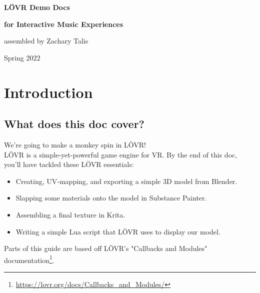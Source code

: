 \documentclass[12pt, letterpaper]{article}
\begin{document}
\begin{titlepage}
    \begin{center}

        \vspace*{5cm}

        \Large{\textbf{L{\"O}VR Demo Docs}}

        \vspace{-0.25cm}

        \Large{\textbf{for Interactive Music Experiences}}

        \vspace{0.5cm}

        \large{assembled by Zachary Talis}

        \vfill

        \small{Spring 2022}

    \end{center}
\end{titlepage}

\tableofcontents
\newpage

\section{Introduction}

\subsection{What does this doc cover?}
We're going to make a monkey spin in L{\"O}VR!\\
L{\"O}VR is a simple-yet-powerful game engine for VR. By the end of this doc, you'll have tackled these L{\"O}VR essentials:
\begin{itemize}
    \item Creating, UV-mapping, and exporting a simple 3D model from Blender.
    \item Slapping some materials onto the model in Substance Painter.
    \item Assembling a final texture in Krita.
    \item Writing a simple Lua script that L{\"O}VR uses to display our model.
\end{itemize}
Parts of this guide are based off L{\"O}VR's "Callbacks and Modules" documentation\footnote{\url{https://lovr.org/docs/Callbacks_and_Modules/}}.
\end{document}
